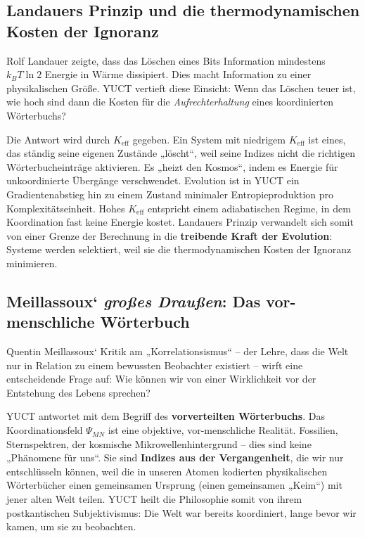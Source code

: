 \documentclass[12pt,a4paper]{article}
\newcommand{\Keff}{K_{\mathrm{eff}}}
\begin{document}
	\subsection{Landauers Prinzip und die thermodynamischen Kosten der Ignoranz}
	
	Rolf Landauer zeigte, dass das Löschen eines Bits Information mindestens \(k_B T \ln 2\) Energie in Wärme dissipiert. Dies macht Information zu einer physikalischen Größe. YUCT vertieft diese Einsicht: Wenn das Löschen teuer ist, wie hoch sind dann die Kosten für die \emph{Aufrechterhaltung} eines koordinierten Wörterbuchs?
	
	Die Antwort wird durch \(\Keff\) gegeben. Ein System mit niedrigem \(\Keff\) ist eines, das ständig seine eigenen Zustände „löscht“, weil seine Indizes nicht die richtigen Wörterbucheinträge aktivieren. Es „heizt den Kosmos“, indem es Energie für unkoordinierte Übergänge verschwendet. Evolution ist in YUCT ein Gradientenabstieg hin zu einem Zustand minimaler Entropieproduktion pro Komplexitätseinheit. Hohes \(\Keff\) entspricht einem adiabatischen Regime, in dem Koordination fast keine Energie kostet. Landauers Prinzip verwandelt sich somit von einer Grenze der Berechnung in die \textbf{treibende Kraft der Evolution}: Systeme werden selektiert, weil sie die thermodynamischen Kosten der Ignoranz minimieren.
	
	\subsection{Meillassoux‘ \emph{großes Draußen}: Das vor-menschliche Wörterbuch}
	
	Quentin Meillassoux‘ Kritik am „Korrelationsismus“ – der Lehre, dass die Welt nur in Relation zu einem bewussten Beobachter existiert – wirft eine entscheidende Frage auf: Wie können wir von einer Wirklichkeit vor der Entstehung des Lebens sprechen?
	
	YUCT antwortet mit dem Begriff des \textbf{vorverteilten Wörterbuchs}. Das Koordinationsfeld \(\Psi_{MN}\) ist eine objektive, vor-menschliche Realität. Fossilien, Sternspektren, der kosmische Mikrowellenhintergrund – dies sind keine „Phänomene für uns“. Sie sind \textbf{Indizes aus der Vergangenheit}, die wir nur entschlüsseln können, weil die in unseren Atomen kodierten physikalischen Wörterbücher einen gemeinsamen Ursprung (einen gemeinsamen „Keim“) mit jener alten Welt teilen. YUCT heilt die Philosophie somit von ihrem postkantischen Subjektivismus: Die Welt war bereits koordiniert, lange bevor wir kamen, um sie zu beobachten.
	
\end{document}
